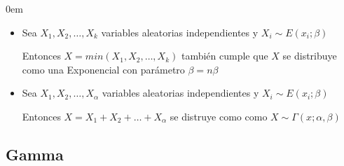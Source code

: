 \documentclass[12pt, fleqn]{report}                             %
\newenvironment{SmallIndentation}[1][0.75em]                    %
        {\begin{adjustwidth}{#1}{}\begin{footnotesize}}             %
        {\end{footnotesize}\end{adjustwidth}}                       %
\theoremstyle{break}                                            %
\begin{document}
\begin{multicols}{2}
\begin{SmallIndentation}[0em]
\begin{itemize}
                                    
                            \item 
                                Sea $X_1, X_2, \dots, X_k$ variables aleatorias independientes
                                y $X_i \sim E(x_i; \beta)$ 

                                Entonces $X = min(X_1, X_2, \dots, X_k)$ también cumple que $X$ se distribuye como
                                una Exponencial con parámetro $\beta = n\beta$


                            \item 
                                Sea $X_1, X_2, \dots, X_\alpha$ variables aleatorias independientes
                                y $X_i \sim E(x_i; \beta)$ 

                                Entonces $X = X_1 + X_2 + \dots + X_\alpha$ se distruye como
                                como $X \sim \Gamma(x; \alpha, \beta)$

                        \end{itemize}


                \end{SmallIndentation}
                \end{multicols}


            \clearpage
            \subsection{Gamma}
\end{document}
